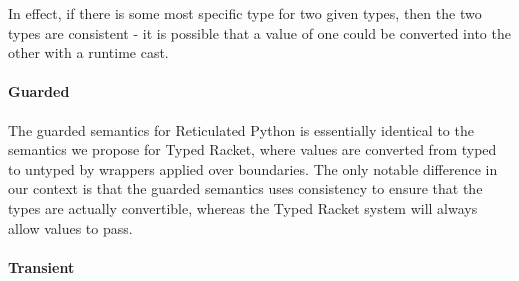 \documentclass[a4paper,USenglish]{tex/lipics-v2016}
\begin{document}
In effect, if there is some most specific type for two given types, then the two types are consistent - it is possible that a value of one could be converted into the other with a runtime cast.

\paragraph{Guarded}

The guarded semantics for Reticulated Python is essentially identical to the semantics we propose for Typed Racket, where values are converted from typed to untyped by wrappers applied over boundaries. The only notable difference in our context is that the guarded semantics uses consistency to ensure that the types are actually convertible, whereas the Typed Racket system will always allow values to pass.


\begin{mathpar}



\end{mathpar}

\begin{mathpar}

\end{mathpar}


\paragraph{Transient}
\end{document}

